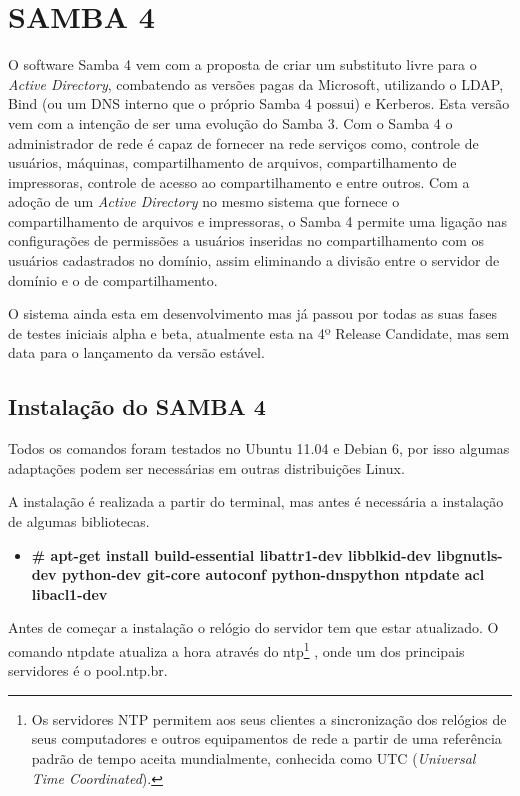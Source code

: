 \chapter{SAMBA 4}

O software Samba 4 vem com a proposta de criar um substituto livre para o \textit{Active Directory}, combatendo as versões pagas da Microsoft, utilizando o LDAP, Bind (ou um DNS interno que o próprio Samba 4 possui) e Kerberos. Esta versão vem com a intenção de ser uma evolução do Samba 3. Com o Samba 4 o administrador de rede é capaz de fornecer na rede serviços como, controle de usuários, máquinas, compartilhamento de arquivos, compartilhamento de impressoras, controle de acesso ao compartilhamento e entre outros.
Com a adoção de um \textit{Active Directory} no mesmo sistema que fornece o compartilhamento de arquivos e impressoras, o Samba 4 permite uma ligação nas configurações de permissões a usuários inseridas no compartilhamento com os usuários cadastrados no domínio, assim eliminando a divisão entre o servidor de domínio e o de compartilhamento.

O sistema ainda esta em desenvolvimento mas já passou por todas as suas fases de testes iniciais alpha e beta, atualmente esta na 4º Release Candidate, mas sem data para o lançamento da versão estável.

\section{Instalação do SAMBA 4}

Todos os comandos foram testados no Ubuntu 11.04 e Debian 6, por isso algumas adaptações podem ser necessárias em outras distribuições Linux.

A instalação é realizada a partir do terminal, mas antes é necessária a instalação de algumas bibliotecas.

\begin{itemize}
	\item \textbf{\# apt-get install build-essential libattr1-dev libblkid-dev libgnutls-dev python-dev git-core autoconf python-dnspython ntpdate acl libacl1-dev}
\end{itemize}

Antes de começar a instalação o relógio do servidor tem que estar atualizado. O comando ntpdate atualiza a hora através do  ntp\footnote[2]{Os servidores NTP permitem aos seus clientes a sincronização dos relógios de seus computadores e outros equipamentos de rede a partir de uma referência padrão de tempo aceita mundialmente, conhecida como UTC (\textit{Universal Time Coordinated}).\cite{RNP}} , onde um dos principais servidores é o pool.ntp.br.

